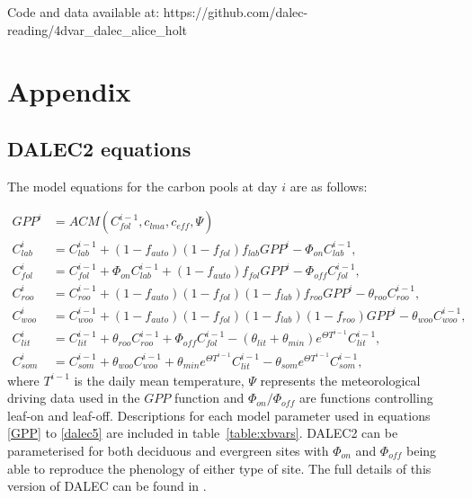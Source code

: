 Code and data available at: https://github.com/dalec-reading/4dvar\_dalec\_alice\_holt

\section{Appendix} \label{sec:appendix}

\subsection{DALEC2 equations} \label{sec:dalec_eqns}

The model equations for the carbon pools at day $i$ are as follows:

\begin{align}
GPP^{i} &= ACM(C_{fol}^{i-1}, c_{lma}, c_{eff}, \Psi) \label{GPP}
\\C_{lab}^{i}&=C_{lab}^{i-1}+(1-f_{auto})(1-f_{fol})f_{lab}GPP^{i}-\Phi _{on}C_{lab}^{i-1}, \label{daleclab}
\\C_{fol}^{i}&=C_{fol}^{i-1}+\Phi_{on}C_{lab}^{i-1}+(1-f_{auto})f_{fol}GPP^{i}-\Phi_{off}C_{fol}^{i-1}, \label{dalec1}
\\C_{roo}^{i}&=C_{roo}^{i-1}+(1-f_{auto})(1-f_{fol})(1-f_{lab})f_{roo}GPP^{i}-\theta_{roo}C_{roo}^{i-1}, 
\\C_{woo}^{i}&=C_{woo}^{i-1}+(1-f_{auto})(1-f_{fol})(1-f_{lab})(1-f_{roo})GPP^{i}-\theta_{woo}C_{woo}^{i-1}, 
\\C_{lit}^{i}&=C_{lit}^{i-1}+\theta_{roo}C_{roo}^{i-1}+\Phi_{off}C_{fol}^{i-1}-(\theta_{lit}+\theta_{min})e^{\Theta T^{i-1}}C_{lit}^{i-1}, 
\\C_{som}^{i}&=C_{som}^{i-1}+\theta_{woo}C_{woo}^{i-1}+\theta_{min}e^{\Theta T^{i-1}}C_{lit}^{i-1}-\theta_{som}e^{\Theta T^{i-1}}C_{som}^{i-1}, \label{dalec5}
\end{align}
where $T^{i-1}$ is the daily mean temperature, $\Psi$ represents the meteorological driving data used in the $GPP$ function and $\Phi_{on} / \Phi_{off}$ are functions controlling leaf-on and leaf-off. Descriptions for each model parameter used in equations \eqref{GPP} to \eqref{dalec5} are included in table~\ref{table:xbvars}. DALEC2 can be parameterised for both deciduous and evergreen sites with $\Phi_{on}$ and $\Phi_{off}$ being able to reproduce the phenology of either type of site. The full details of this version of DALEC can be found in \cite{Bloom2015}. 

